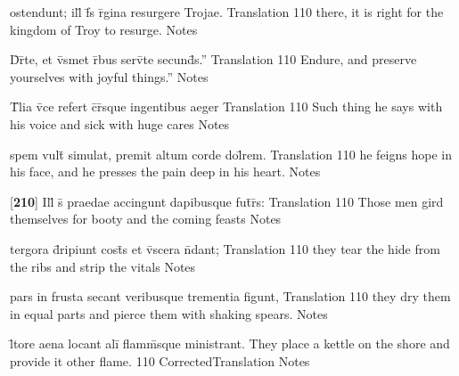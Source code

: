 \latline
  {ostendunt; ill\={\macron {\i}} f\={}s r\={}gina resurgere Trojae.}
  { Translation }
  {110}
  { there, it is right for the kingdom of Troy to resurge. }
  { Notes }


\latline
  {D\={}r\={}te, et v\={}smet r\={}bus serv\={}te secund\={\macron {\i}}s.''}
  { Translation }
  {110}
  { Endure, and preserve yourselves with joyful things.'' }
  { Notes }


\latline
  {T\={}lia v\={}ce refert c\={}r\={\macron {\i}}sque ingentibus aeger}
  { Translation }
  {110}
  { Such thing he says with his voice and sick with huge cares  }
  { Notes }


\latline
  {spem vult\={} simulat, premit altum corde dol\={}rem.}
  { Translation }
  {110}
  { he feigns hope in his face, and he presses the pain deep in his heart. }
  { Notes }


\latline
  {[\textbf{210}] Ill\={\macron {\i}} s\={} praedae accingunt dapibusque fut\={}r\={\macron {\i}}s:}
  { Translation }
  {110}
  { Those men gird themselves for booty and the coming feasts }
  { Notes }


\latline
  {tergora d\={\macron {\i}}ripiunt cost\={\macron {\i}}s et v\={\macron {\i}}scera n\={}dant;}
  { Translation }
  {110}
  { they tear the hide from the ribs and strip the vitals }
  { Notes }


\latline
  {pars in frusta secant veribusque trementia figunt,}
  { Translation }
  {110}
  { they dry them in equal parts and pierce them with shaking spears. }
  { Notes }


\latline
  {l\={\macron {\i}}tore aena locant ali\={\macron {\i}} flamm\={}sque ministrant.}
  { They place a kettle on the shore and provide it other flame. }
  {110}
  { CorrectedTranslation }
  { Notes }

